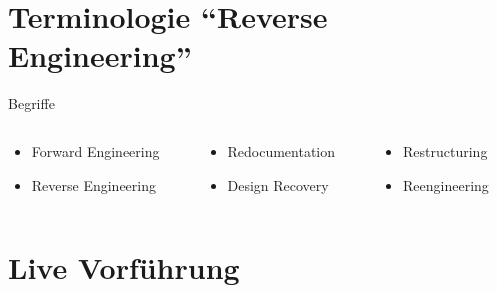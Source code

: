 \documentclass[
  de, %
  inputenc=utf8,
]{tuhhslides}
\begin{document}
\section{Terminologie "`Reverse Engineering"'}
\begin{frame}{Begriffe}
  \begin{columns}
    \begin{column}{0.37\textwidth}
      \begin{itemize}
        \item Forward Engineering\vspace{0.25cm}
        \item Reverse Engineering
      \end{itemize}
    \end{column}
    \begin{column}{0.33\textwidth}
      \begin{itemize}
        \item Redocumentation\vspace{0.25cm}
        \item Design Recovery
      \end{itemize}
    \end{column}
    \begin{column}{0.3\textwidth}
      \begin{itemize}
        \item Restructuring\vspace{0.25cm}
        \item Reengineering
      \end{itemize}
    \end{column}
  \end{columns}
  \begin{center}
    \resizebox{11.5cm}{6cm}{%
      
    }
  \end{center}
\end{frame}



\section{Live Vorführung}
\begin{frame}
  \begin{center}
  \end{center}
\end{frame}
\end{document}
